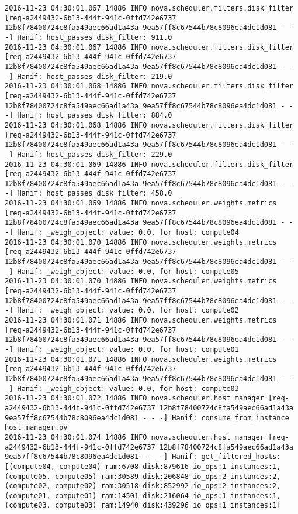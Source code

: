\begin{lstlisting}[frame=single, caption={The filter scheduler log trace for 10 virtual instances}, label={lst:filterschedulercodetracelog10vi}, escapechar=|]
2016-11-23 04:30:01.067 14886 INFO nova.scheduler.filters.disk_filter [req-a2449432-6b13-444f-941c-0ffd742e6737 12b8f78400724c8fa549aec66ad1a43a 9ea57ff8c67544b78c8096ea4dc1d081 - - -] Hanif: host_passes disk_filter: 911.0
2016-11-23 04:30:01.067 14886 INFO nova.scheduler.filters.disk_filter [req-a2449432-6b13-444f-941c-0ffd742e6737 12b8f78400724c8fa549aec66ad1a43a 9ea57ff8c67544b78c8096ea4dc1d081 - - -] Hanif: host_passes disk_filter: 219.0
2016-11-23 04:30:01.068 14886 INFO nova.scheduler.filters.disk_filter [req-a2449432-6b13-444f-941c-0ffd742e6737 12b8f78400724c8fa549aec66ad1a43a 9ea57ff8c67544b78c8096ea4dc1d081 - - -] Hanif: host_passes disk_filter: 884.0
2016-11-23 04:30:01.068 14886 INFO nova.scheduler.filters.disk_filter [req-a2449432-6b13-444f-941c-0ffd742e6737 12b8f78400724c8fa549aec66ad1a43a 9ea57ff8c67544b78c8096ea4dc1d081 - - -] Hanif: host_passes disk_filter: 229.0
2016-11-23 04:30:01.069 14886 INFO nova.scheduler.filters.disk_filter [req-a2449432-6b13-444f-941c-0ffd742e6737 12b8f78400724c8fa549aec66ad1a43a 9ea57ff8c67544b78c8096ea4dc1d081 - - -] Hanif: host_passes disk_filter: 458.0
2016-11-23 04:30:01.069 14886 INFO nova.scheduler.weights.metrics [req-a2449432-6b13-444f-941c-0ffd742e6737 12b8f78400724c8fa549aec66ad1a43a 9ea57ff8c67544b78c8096ea4dc1d081 - - -] Hanif: _weigh_object: value: 0.0, for host: compute04
2016-11-23 04:30:01.070 14886 INFO nova.scheduler.weights.metrics [req-a2449432-6b13-444f-941c-0ffd742e6737 12b8f78400724c8fa549aec66ad1a43a 9ea57ff8c67544b78c8096ea4dc1d081 - - -] Hanif: _weigh_object: value: 0.0, for host: compute05
2016-11-23 04:30:01.070 14886 INFO nova.scheduler.weights.metrics [req-a2449432-6b13-444f-941c-0ffd742e6737 12b8f78400724c8fa549aec66ad1a43a 9ea57ff8c67544b78c8096ea4dc1d081 - - -] Hanif: _weigh_object: value: 0.0, for host: compute02
2016-11-23 04:30:01.071 14886 INFO nova.scheduler.weights.metrics [req-a2449432-6b13-444f-941c-0ffd742e6737 12b8f78400724c8fa549aec66ad1a43a 9ea57ff8c67544b78c8096ea4dc1d081 - - -] Hanif: _weigh_object: value: 0.0, for host: compute01
2016-11-23 04:30:01.071 14886 INFO nova.scheduler.weights.metrics [req-a2449432-6b13-444f-941c-0ffd742e6737 12b8f78400724c8fa549aec66ad1a43a 9ea57ff8c67544b78c8096ea4dc1d081 - - -] Hanif: _weigh_object: value: 0.0, for host: compute03
2016-11-23 04:30:01.072 14886 INFO nova.scheduler.host_manager [req-a2449432-6b13-444f-941c-0ffd742e6737 12b8f78400724c8fa549aec66ad1a43a 9ea57ff8c67544b78c8096ea4dc1d081 - - -] Hanif: consume_from_instance host_manager.py
2016-11-23 04:30:01.074 14886 INFO nova.scheduler.host_manager [req-a2449432-6b13-444f-941c-0ffd742e6737 12b8f78400724c8fa549aec66ad1a43a 9ea57ff8c67544b78c8096ea4dc1d081 - - -] Hanif: get_filtered_hosts: [(compute04, compute04) ram:6708 disk:879616 io_ops:1 instances:1, (compute05, compute05) ram:30589 disk:206848 io_ops:2 instances:2, (compute02, compute02) ram:30518 disk:852992 io_ops:2 instances:2, (compute01, compute01) ram:14501 disk:216064 io_ops:1 instances:1, (compute03, compute03) ram:14940 disk:439296 io_ops:1 instances:1]

\end{lstlisting}
